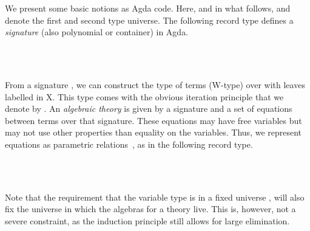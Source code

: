 \documentclass{easychair}
\begin{document}
We present some basic notions as Agda code.
Here, and in what follows, \UZ{} and \UO{} denote the first and second type
universe.
The following record type defines a \emph{signature} (also polynomial or
container) in Agda.
\begin{code}%
\>[0]\AgdaSpace{}%
 \ofT \UO%
\AgdaSpace{}%
\<%
\\
\>[2][@{}l@{\AgdaIndent{0}}]%
\>[4]%
\>[9]\AgdaSymbol{:}\AgdaSpace{}%
\UZ\AgdaSpace{}%
\<%
\\
%
\>[4]%
\>[9]\AgdaSymbol{:}\AgdaSpace{}%
\AgdaSpace{}%
\AgdaSpace{}%
\UZ\AgdaSpace{}%
\<%
\end{code}
From a signature \sig \ofT {}, we can construct the type
 of terms (W-type) over \sig{} with leaves labelled in X.
This type comes with the obvious iteration principle that we denote by
.
An \emph{algebraic theory} is given by a signature and a set of equations
between terms over that signature.
These equations may have free variables but may not use other properties than
equality on the variables.
Thus, we represent equations as parametric
relations~\cite{Hermida14:LogicalRelationsParametricity}, as in the following
record type.
\begin{code}%
\>[0]\AgdaSpace{}%
\AgdaSpace{}%
\AgdaSymbol{:}\AgdaSpace{}%
\UO%
\AgdaSpace{}%
\<%
\\
\>[2][@{}l@{\AgdaIndent{0}}]%
\>[4]%
\>[9]\AgdaSymbol{:}\AgdaSpace{}%
\<%
\\
%
\>[4]%
\>[9]\AgdaSymbol{:}\AgdaSpace{}%
\AgdaSpace{}%
\AgdaSymbol{\{}\AgdaSpace{}%
\AgdaSymbol{:}\AgdaSpace{}%
\UZ\AgdaSpace{}%
\AgdaSymbol{\}}\AgdaSpace{}%
\AgdaSpace{}%
\AgdaSpace{}%
\AgdaSymbol{(}\AgdaSpace{}%
\AgdaSpace{}%
\AgdaSymbol{)}\AgdaSpace{}%
\<%
\end{code}
Note that the requirement that the variable type  is in a fixed
universe , will also fix the universe in which the algebras for
a theory live.
This is, however, not a severe constraint, as the induction principle still
allows for large elimination.
\end{document}

